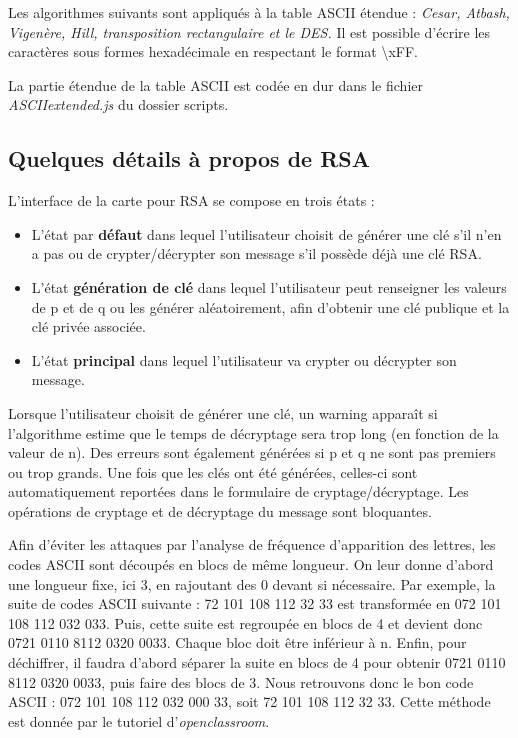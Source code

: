 \documentclass{article}
\begin{document}
Les algorithmes suivants sont appliqués à la table ASCII étendue : \textit{Cesar, Atbash, Vigenère, Hill, transposition rectangulaire et le DES.}
Il est possible d'écrire les caractères sous formes hexadécimale en respectant le format \textbackslash{}xFF.

La partie étendue de la table ASCII est codée en dur dans le fichier \textit{ASCIIextended.js} du dossier scripts.

\subsection{Quelques détails à propos de RSA}
L'interface de la carte pour RSA se compose en trois états : 
\begin{itemize}
\item L'état par \textbf{défaut} dans lequel l'utilisateur choisit de générer une clé s'il n'en a pas ou de crypter/décrypter son message s'il possède déjà une clé RSA. 
\item L'état \textbf{génération de clé} dans lequel l'utilisateur peut renseigner les valeurs de p et de q ou les générer aléatoirement, afin d'obtenir une clé publique et la clé privée associée. 
\item L'état \textbf{principal} dans lequel l'utilisateur va crypter ou décrypter son message.
\end{itemize}

Lorsque l'utilisateur choisit de générer une clé, un warning apparaît si l'algorithme estime que le temps de décryptage sera trop long (en fonction de la valeur de n). Des erreurs sont également générées si p et q ne sont pas premiers ou trop grands.
Une fois que les clés ont été générées, celles-ci sont automatiquement reportées dans le formulaire de cryptage/décryptage.
Les opérations de cryptage et de décryptage du message sont bloquantes. 

Afin d'éviter les attaques par l'analyse de fréquence d'apparition des lettres, les codes ASCII sont découpés en blocs de même longueur. On leur donne d'abord une longueur fixe, ici 3, en rajoutant des 0 devant si nécessaire. Par exemple, la suite de codes ASCII suivante : 72 101 108 112 32 33 est transformée en 072 101 108 112 032 033. Puis, cette suite est regroupée en blocs de 4 et devient donc 0721 0110 8112 0320 0033. Chaque bloc doit être inférieur à n. 
Enfin, pour déchiffrer, il faudra d'abord séparer la suite en blocs de 4 pour obtenir 0721 0110 8112 0320 0033, puis faire des blocs de 3. Nous retrouvons donc le bon code ASCII : 072 101 108 112 032 000 33, soit 72 101 108 112 32 33.
Cette méthode est donnée par le tutoriel d'\textit{openclassroom}\cite{openclassroom}.
\end{document}
